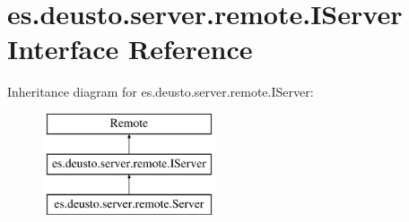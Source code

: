 \hypertarget{interfacees_1_1deusto_1_1server_1_1remote_1_1_i_server}{}\section{es.\+deusto.\+server.\+remote.\+I\+Server Interface Reference}
\label{interfacees_1_1deusto_1_1server_1_1remote_1_1_i_server}
Inheritance diagram for es.\+deusto.\+server.\+remote.\+I\+Server\+:\begin{figure}[H]
\begin{center}
\leavevmode
\includegraphics[height=3.000000cm]{interfacees_1_1deusto_1_1server_1_1remote_1_1_i_server}
\end{center}
\end{figure}
